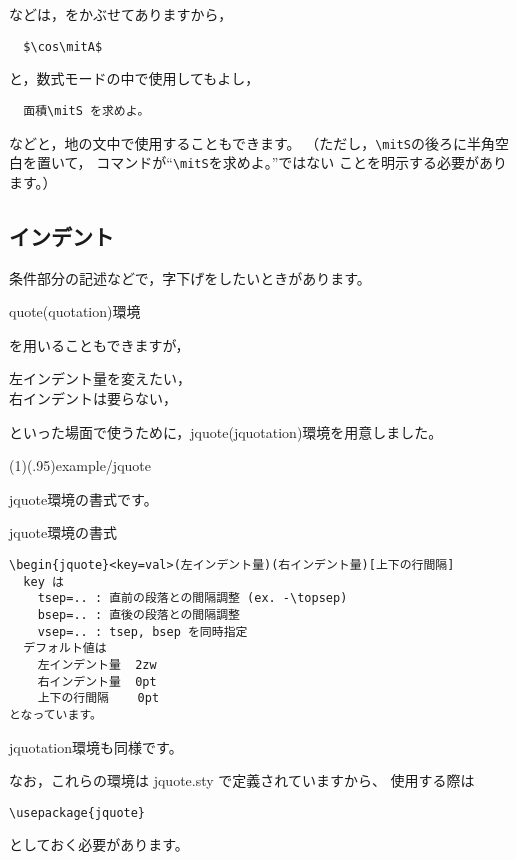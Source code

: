 \documentclass[fleqn,a4j]{jarticle}
\begin{document}
などは，をかぶせてありますから，
\begin{jquote}
\begin{verbatim}
  $\cos\mitA$
\end{verbatim}
\end{jquote}
と，数式モードの中で使用してもよし，
\begin{jquote}
\begin{verbatim}
  面積\mitS を求めよ。
\end{verbatim}
\end{jquote}
などと，地の文中で使用することもできます。
（ただし，\verb+\mitS+の後ろに半角空白を置いて，
コマンドが``\verb+\mitS+\!を求めよ。''ではない
ことを明示する必要があります。）

\subsection{インデント\label{L-jquote}}
条件部分の記述などで，字下げをしたいときがあります。\par
\centerline{\textsf{quote(quotation)}環境}
を用いることもできますが，
\begin{jquote}
    左インデント量を変えたい，\\
    右インデントは要らない，
\end{jquote}
といった場面で使うために，\textsf{jquote(jquotation)}環境を用意しました。

\showexample[jquote](1)(.95){example/jquote}
%

\textsf{jquote}環境の書式です。

\begin{itemsquarebox}{\textsf{jquote}環境の書式}
\begin{verbatim}
\begin{jquote}<key=val>(左インデント量)(右インデント量)[上下の行間隔]
  key は
    tsep=.. : 直前の段落との間隔調整 (ex. -\topsep)
    bsep=.. : 直後の段落との間隔調整
    vsep=.. : tsep, bsep を同時指定
  デフォルト値は
    左インデント量  2zw
    右インデント量  0pt
    上下の行間隔    0pt
となっています。
\end{verbatim}
\end{itemsquarebox}

\textsf{jquotation}環境も同様です。

なお，これらの環境は \textsf{jquote.sty} で定義されていますから、
使用する際は
\begin{jquote}
\begin{verbatim}
\usepackage{jquote}
\end{verbatim}
\end{jquote}
としておく必要があります。
\end{document}
